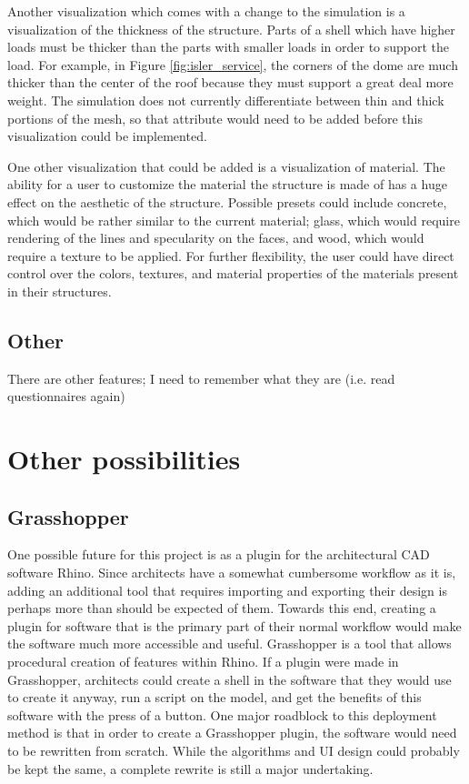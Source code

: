\documentclass{thesis}
\begin{document}
Another visualization which comes with a change to the simulation is a visualization of the thickness of the structure.  Parts
of a shell which have higher loads must be thicker than the parts with smaller loads in order to support the load.  For example,
in Figure \ref{fig:isler_service}, the corners of the dome are much thicker than the center of the roof because they must support
a great deal more weight.  The simulation does not currently differentiate between thin and thick portions of the mesh, so that
attribute would need to be added before this visualization could be implemented.

One other visualization that could be added is a visualization of material.  The ability for a user to customize the material the
structure is made of has a huge effect on the aesthetic of the structure.  Possible presets could include concrete, which would be
rather similar to the current material; glass, which would require rendering of the lines and specularity on the faces, and wood,
which would require a texture to be applied.  For further flexibility, the user could have direct control over the colors, textures,
and material properties of the materials present in their structures.

\subsection{Other}
There are other features; I need to remember what they are (i.e. read questionnaires again)

\section{Other possibilities}

\subsection{Grasshopper}
One possible future for this project is as a plugin for the architectural CAD software Rhino.  Since architects have a
somewhat cumbersome workflow as it is, adding an additional tool that requires importing and exporting their design is
perhaps more than should be expected of them.  Towards this end, creating a plugin for software that is the primary part
of their normal workflow would make the software much more accessible and useful.  Grasshopper is a tool that allows procedural
creation of features within Rhino.  If a plugin were made in Grasshopper, architects could create a shell in the software that
they would use to create it anyway, run a script on the model, and get the benefits of this software with the press of a
button.  One major roadblock to this deployment method is that in order to create a Grasshopper plugin, the software would
need to be rewritten from scratch.  While the algorithms and UI design could probably be kept the same, a complete rewrite
is still a major undertaking.
\end{document}
